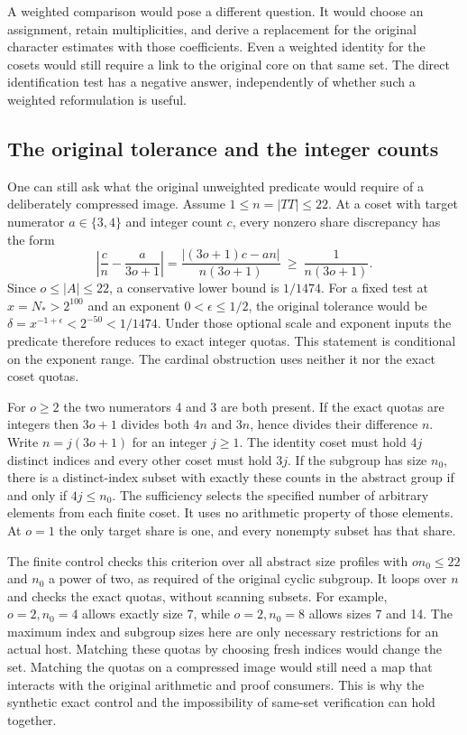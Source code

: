 \documentclass[12pt,letterpaper]{article}
\begin{document}
A weighted comparison would pose a different question. It would choose an assignment, retain multiplicities, and derive a replacement for the original character estimates with those coefficients. Even a weighted identity for the cosets would still require a link to the original core on that same set. The direct identification test has a negative answer, independently of whether such a weighted reformulation is useful.

\subsection{The original tolerance and the integer counts}
One can still ask what the original unweighted predicate would require of a deliberately compressed image. Assume $1\le n=|TT|\le22$. At a coset with target numerator $a\in\{3,4\}$ and integer count $c$, every nonzero share discrepancy has the form
\[
 \left|\frac cn-\frac{a}{3o+1}\right|
 =\frac{|(3o+1)c-an|}{n(3o+1)}
 \ \ge\ \frac{1}{n(3o+1)}.
\]
Since $o\le |A|\le22$, a conservative lower bound is $1/1474$. For a fixed test at $x=N_*>2^{100}$ and an exponent $0<\epsilon\le1/2$, the original tolerance would be $\delta=x^{-1+\epsilon}<2^{-50}<1/1474$. Under those optional scale and exponent inputs the predicate therefore reduces to exact integer quotas. This statement is conditional on the exponent range. The cardinal obstruction uses neither it nor the exact coset quotas.

For $o\ge2$ the two numerators 4 and 3 are both present. If the exact quotas are integers then $3o+1$ divides both $4n$ and $3n$, hence divides their difference $n$. Write $n=j(3o+1)$ for an integer $j\ge1$. The identity coset must hold $4j$ distinct indices and every other coset must hold $3j$. If the subgroup has size $n_0$, there is a distinct-index subset with exactly these counts in the abstract group if and only if $4j\le n_0$. The sufficiency selects the specified number of arbitrary elements from each finite coset. It uses no arithmetic property of those elements. At $o=1$ the only target share is one, and every nonempty subset has that share.

The finite control checks this criterion over all abstract size profiles with $o n_0\le22$ and $n_0$ a power of two, as required of the original cyclic subgroup. It loops over $n$ and checks the exact quotas, without scanning subsets. For example, $o=2,n_0=4$ allows exactly size 7, while $o=2,n_0=8$ allows sizes 7 and 14. The maximum index and subgroup sizes here are only necessary restrictions for an actual host. Matching these quotas by choosing fresh indices would change the set. Matching the quotas on a compressed image would still need a map that interacts with the original arithmetic and proof consumers. This is why the synthetic exact control and the impossibility of same-set verification can hold together.
\end{document}

